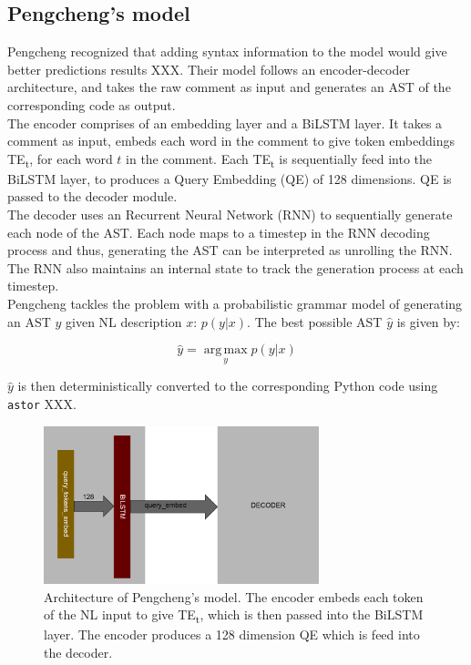 \documentclass{IEEEtran}
\begin{document}
      \subsection{Pengcheng's model}
      Pengcheng recognized that adding syntax information to the model would give better
      predictions results XXX. Their model follows an encoder-decoder architecture, and takes
      the raw comment as input and generates an AST of the corresponding 
      code as output. \\
      \hspace*{4mm}The encoder comprises of an embedding layer and a BiLSTM
      layer. It takes a comment as input, embeds each word in the comment to give token embeddings
      TE\textsubscript{t}, for each word $ t $ in the comment. Each TE\textsubscript{t} is 
      sequentially feed into the 
      BiLSTM layer, to produces a Query Embedding (QE) of 128 dimensions. QE is passed to the
      decoder module. \\
      \hspace*{4mm}The decoder uses an Recurrent Neural Network (RNN) to sequentially generate 
      each node of the AST. Each node maps to a timestep in the RNN decoding process and thus, 
      generating the AST can be interpreted as unrolling the RNN. The RNN also maintains an 
      internal state to track the generation process at each timestep. \\
      \hspace*{4mm}Pengcheng tackles the problem with a probabilistic grammar model of
      generating an AST $ y $ given NL description $ x $: $ p(y\vert x) $. The best possible AST 
      $ \hat{y} $ is given by:

      \begin{equation}
        \label{eq:pengcheng}
        \hat{y} = \operatorname*{arg\,max}_y p(y\vert x)
      \end{equation}

      $ \hat{y} $ is then deterministically converted to the corresponding Python code using
      \texttt{astor} XXX.

      \begin{figure}[h]
        \centering
        \includegraphics[width=8cm]{pengcheng.png}
        \caption{Architecture of Pengcheng's model. The encoder embeds each token of the NL input
        to give TE\textsubscript{t}, which is then passed into the BiLSTM layer. The encoder
        produces a 128 dimension QE which is feed into the decoder.}
        \label{fig:pengcheng}
      \end{figure}
\end{document}
